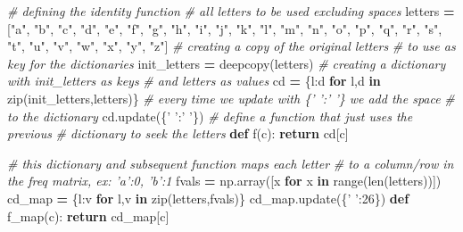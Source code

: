 \documentclass[]{article}
\newenvironment{Shaded}{\begin{snugshade}}{\end{snugshade}}
\newcommand{\BuiltInTok}[1]{#1}
\newcommand{\CommentTok}[1]{\textcolor[rgb]{0.56,0.35,0.01}{\textit{#1}}}
\newcommand{\ControlFlowTok}[1]{\textcolor[rgb]{0.13,0.29,0.53}{\textbf{#1}}}
\newcommand{\DecValTok}[1]{\textcolor[rgb]{0.00,0.00,0.81}{#1}}
\newcommand{\KeywordTok}[1]{\textcolor[rgb]{0.13,0.29,0.53}{\textbf{#1}}}
\newcommand{\NormalTok}[1]{#1}
\newcommand{\OperatorTok}[1]{\textcolor[rgb]{0.81,0.36,0.00}{\textbf{#1}}}
\newcommand{\StringTok}[1]{\textcolor[rgb]{0.31,0.60,0.02}{#1}}
\begin{document}
\begin{Shaded}
\begin{Highlighting}[]
    \CommentTok{# defining the identity function}
    \CommentTok{# all letters to be used excluding spaces}
\NormalTok{    letters }\OperatorTok{=}\NormalTok{ [}\StringTok{"a"}\NormalTok{, }\StringTok{"b"}\NormalTok{, }\StringTok{"c"}\NormalTok{, }\StringTok{"d"}\NormalTok{,}
                \StringTok{"e"}\NormalTok{, }\StringTok{"f"}\NormalTok{, }\StringTok{"g"}\NormalTok{, }\StringTok{"h"}\NormalTok{, }
                \StringTok{"i"}\NormalTok{, }\StringTok{"j"}\NormalTok{, }\StringTok{"k"}\NormalTok{, }\StringTok{"l"}\NormalTok{, }
                \StringTok{"m"}\NormalTok{, }\StringTok{"n"}\NormalTok{, }\StringTok{"o"}\NormalTok{, }\StringTok{"p"}\NormalTok{, }
                \StringTok{"q"}\NormalTok{, }\StringTok{"r"}\NormalTok{, }\StringTok{"s"}\NormalTok{, }\StringTok{"t"}\NormalTok{, }
                \StringTok{"u"}\NormalTok{, }\StringTok{"v"}\NormalTok{, }\StringTok{"w"}\NormalTok{, }\StringTok{"x"}\NormalTok{, }
                \StringTok{"y"}\NormalTok{, }\StringTok{"z"}\NormalTok{]}
    \CommentTok{# creating a copy of the original letters}
    \CommentTok{# to use as key for the dictionaries}
\NormalTok{    init_letters }\OperatorTok{=}\NormalTok{ deepcopy(letters)}
    \CommentTok{# creating a dictionary with init_letters as keys}
    \CommentTok{# and letters as values}
\NormalTok{    cd }\OperatorTok{=}\NormalTok{ \{l:d }\ControlFlowTok{for}\NormalTok{ l,d }\KeywordTok{in} \BuiltInTok{zip}\NormalTok{(init_letters,letters)\}}
    \CommentTok{# every time we update with \{' ':' '\} we add the space}
    \CommentTok{# to the dictionary}
\NormalTok{    cd.update(\{}\StringTok{' '}\NormalTok{:}\StringTok{' '}\NormalTok{\})}
    \CommentTok{# define a function that just uses the previous}
    \CommentTok{# dictionary to seek the letters}
    \KeywordTok{def}\NormalTok{ f(c):}
        \ControlFlowTok{return}\NormalTok{ cd[c]}
    
    \CommentTok{# this dictionary and subsequent function maps each letter}
    \CommentTok{# to a column/row in the freq matrix, ex: 'a':0, 'b':1 }
\NormalTok{    fvals }\OperatorTok{=}\NormalTok{ np.array([x }\ControlFlowTok{for}\NormalTok{ x }\KeywordTok{in} \BuiltInTok{range}\NormalTok{(}\BuiltInTok{len}\NormalTok{(letters))])}
\NormalTok{    cd_map }\OperatorTok{=}\NormalTok{ \{l:v }\ControlFlowTok{for}\NormalTok{ l,v }\KeywordTok{in} \BuiltInTok{zip}\NormalTok{(letters,fvals)\}}
\NormalTok{    cd_map.update(\{}\StringTok{' '}\NormalTok{:}\DecValTok{26}\NormalTok{\})}
    \KeywordTok{def}\NormalTok{ f_map(c):}
        \ControlFlowTok{return}\NormalTok{ cd_map[c]}


\end{Highlighting}
\end{Shaded}
\end{document}
